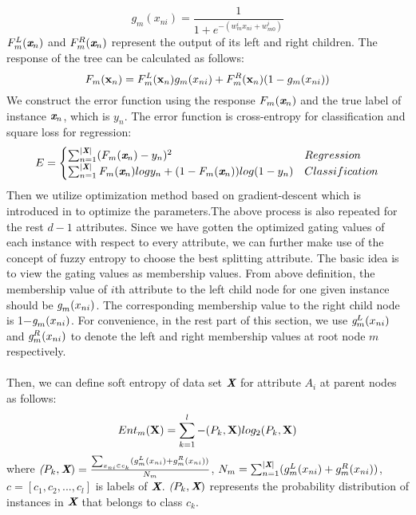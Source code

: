 \documentclass[12pt]{article}%
\begin{document}
\emph {\[ g_m(x_{ni})=\frac {1}{1+e^{-(w_m^ix_{ni}+w_{m0}^i)}}\]}$F_m^L(\emph{\textbf x}_n)$ and $F_m^R(\emph{\textbf x}_n)$ represent the output of its left and right children. The response of the tree can be calculated as follows:
\emph {\[ F_m(\textbf x_n)=F_m^L(\textbf x_n)g_m(x_{ni})+F_m^R(\textbf x_n)(1-g_m(x_{ni}))\]}We construct the error function using the response $F_m(\emph{\textbf x}_n)$ and the true label of instance $\emph{\textbf x}_n$, which is $y_n$. The error function is cross-entropy for classification and square loss for regression:
\begin{equation*}
        E = \begin{cases}
                        \text{$\sum_{n=1}^{|\emph{\textbf X}|} (F_m(\emph{\textbf x}_n)-y_n)^2$}  & Regression\\
                        \text{$\sum_{n=1}^{|\emph{\textbf X}|} F_m(\emph{\textbf x}_n) log y_n + (1-F_m(\emph{\textbf x}_n)) log(1-y_n) $} &Classification
                    \end{cases}
\end{equation*}Then we utilize optimization method based on gradient-descent which is introduced in \cite{irsoy2012soft} to optimize the parameters.The above process is also repeated for the rest $d-1$ attributes. Since we have gotten the optimized gating values of each instance with respect to every attribute, we can further make use of the concept of fuzzy entropy to choose the best splitting attribute. The basic idea is to view the gating values as membership values. From above definition, the membership value of $i$th attribute to the left child node for one given instance should be $\emph g_m(x_{ni})$. The corresponding membership value to the right child node is 1$-$$\emph g_m(x_{ni})$. For convenience, in the rest part of this section, we use $\emph g_m^L(x_{ni})$ and $\emph g_m^R(x_{ni})$ to denote the left and right membership values at root node $m$ respectively. 
\\\\
Then, we can define soft entropy of data set $\emph{\textbf X}$ for attribute $A_i$ at parent nodes as follows:
\emph {\[ Ent_m(\textbf X)=\sum_{k=1}^{l} -(P_k,\textbf X)log_2(P_k,\textbf X)\]}where $\emph (P_k,\emph{\textbf X})=\frac{\sum_{x_{ni}\in c_k}(g_m^L(x_{ni})+g_m^R(x_{ni}))}{N_m}$, $N_m=\sum_{n=1}^{|\emph{\textbf X}|}(g_m^L(x_{ni})+g_m^R(x_{ni}))$, $c= [c_1,c_2,...,c_l]$ is labels of $\emph{\textbf X}$. $\emph (P_k,\emph{\textbf X})$ represents the probability distribution of instances in $\emph{\textbf X}$ that belongs to class $c_k$.
$$
\end{document}
